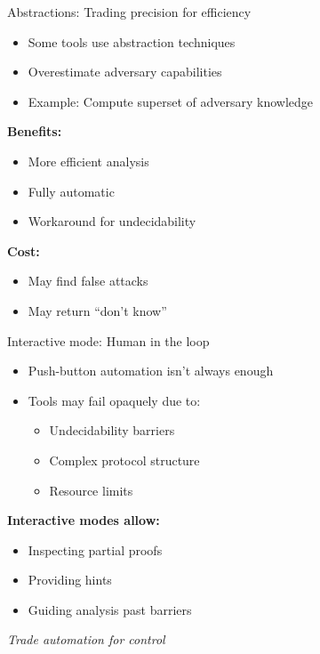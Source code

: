 \documentclass[aspectratio=169, lualatex, handout]{beamer}
\begin{document}
\begin{frame}{Abstractions: Trading precision for efficiency}
	\begin{itemize}
		\item Some tools use abstraction techniques
		\item Overestimate adversary capabilities
		\item Example: Compute superset of adversary knowledge
	\end{itemize}
	\vspace{0.5em}
	\textbf{Benefits:}
	\begin{itemize}
		\item More efficient analysis
		\item Fully automatic
		\item Workaround for undecidability
	\end{itemize}
	\textbf{Cost:}
	\begin{itemize}
		\item May find false attacks
		\item May return ``don't know''
	\end{itemize}
\end{frame}

\begin{frame}{Interactive mode: Human in the loop}
	\begin{itemize}
		\item Push-button automation isn't always enough
		\item Tools may fail opaquely due to:
		      \begin{itemize}
			      \item Undecidability barriers
			      \item Complex protocol structure
			      \item Resource limits
		      \end{itemize}
	\end{itemize}
	\vspace{0.5em}
	\textbf{Interactive modes allow:}
	\begin{itemize}
		\item Inspecting partial proofs
		\item Providing hints
		\item Guiding analysis past barriers
	\end{itemize}
	\vspace{0.5em}
	\begin{center}
		\textit{Trade automation for control}
	\end{center}
\end{frame}
\end{document}
